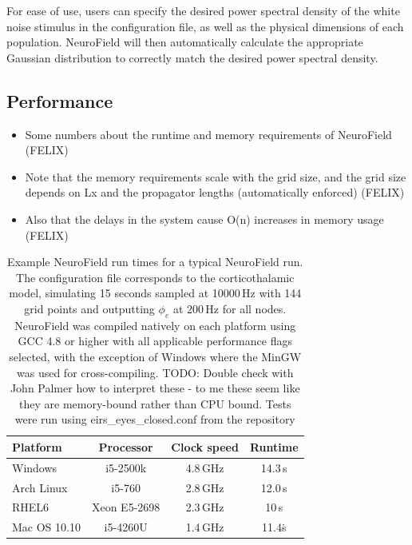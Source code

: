 \documentclass[preprint,review,10pt,authoryear,letterpaper]{elsarticle}
\begin{document}
For ease of use, users can specify the desired power spectral density of the white noise stimulus in the configuration file, as well as the physical dimensions of each population. NeuroField will then automatically calculate the appropriate Gaussian distribution to correctly match the desired power spectral density. 


\subsection{Performance}

\begin{itemize}
\item Some numbers about the runtime and memory requirements of NeuroField (FELIX)
\item Note that the memory requirements scale with the grid size, and the grid size depends on Lx and the propagator lengths (automatically enforced) (FELIX)
\item Also that the delays in the system cause O(n) increases in memory usage (FELIX)
\end{itemize}

\begin{table}[!t]
\begin{center}
\begin{tabular}{l c c c }
\toprule
{\bf Platform}    & {\bf Processor}                   & {\bf Clock speed}       & {\bf Runtime} \\
\midrule
Windows	& i5-2500k & 4.8\,GHz & 14.3\,s \\
Arch Linux & i5-760 & 2.8\,GHz& 12.0\,s \\
RHEL6 & Xeon E5-2698 & 2.3\,GHz & 10\,s \\
Mac OS 10.10 & i5-4260U & 1.4\,GHz & 11.4\.s \\
\bottomrule
\end{tabular} 
\caption{Example NeuroField run times for a typical NeuroField run. The configuration file corresponds to the corticothalamic model, simulating 15 seconds sampled at 10000\,Hz with 144 grid points and outputting $\phi_e$ at 200\,Hz for all nodes. NeuroField was compiled natively on each platform using GCC 4.8 or higher with all applicable performance flags selected, with the exception of Windows where the MinGW was used for cross-compiling. TODO: Double check with John Palmer how to interpret these - to me these seem like they are memory-bound rather than CPU bound. Tests were run using eirs\_eyes\_closed.conf from the repository}
\label{table:params} 
\end{center} 
\end{table}
\end{document}
